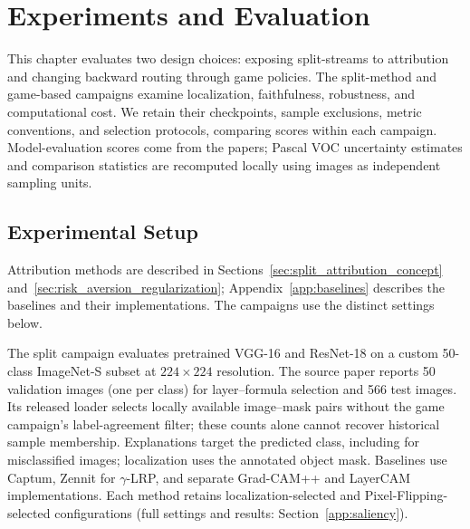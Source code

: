 \chapter{Experiments and Evaluation}\label{ch:experiments}

This chapter evaluates two design choices: exposing split-streams to attribution and changing backward routing through game policies. The split-method and game-based campaigns examine localization, faithfulness, robustness, and computational cost. We retain their checkpoints, sample exclusions, metric conventions, and selection protocols, comparing scores within each campaign. Model-evaluation scores come from the papers; Pascal VOC uncertainty estimates and comparison statistics are recomputed locally using images as independent sampling units.

\section{Experimental Setup}\label{sec:experimental_setup}\label{sec:quantus_evaluation}

Attribution methods are described in Sections~\ref{sec:split_attribution_concept} and~\ref{sec:risk_aversion_regularization}; Appendix~\ref{app:baselines} describes the baselines and their implementations. The campaigns use the distinct settings below.

The split campaign evaluates pretrained VGG-16 and ResNet-18 on a custom 50-class ImageNet-S subset at $224\times224$ resolution. The source paper reports 50 validation images (one per class) for layer--formula selection and 566 test images. Its released loader selects locally available image--mask pairs without the game campaign's label-agreement filter; these counts alone cannot recover historical sample membership. Explanations target the predicted class, including for misclassified images; localization uses the annotated object mask. Baselines use Captum, Zennit for $\gamma$-LRP, and separate Grad-CAM++ and LayerCAM implementations. Each method retains localization-selected and Pixel-Flipping-selected configurations (full settings and results: Section~\ref{app:saliency}).

